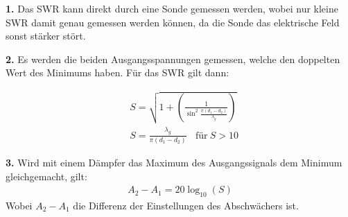\textbf{1.} Das SWR kann direkt durch eine Sonde gemessen werden, wobei nur kleine SWR
damit genau gemessen werden können, da die Sonde das elektrische Feld sonst stärker
stört.

\textbf{2.} Es werden die beiden Ausgangsspannungen gemessen, welche den doppelten Wert
des Minimums haben. Für das SWR gilt dann:

\begin{align}
  &S = \sqrt{1+  \left(\frac{1}{\sin^2{ \frac{\pi(d_1 - d_2)}{\lambda_g} }} \right) } \\
  &S = \frac{\lambda_g}{\pi(d_1-d_2)} \: \:\:\: \text{für} \:S > 10
\end{align}

\textbf{3.} Wird mit einem Dämpfer das Maximum des Ausgangssignals dem Minimum gleichgemacht, gilt:
\begin{align}
  A_2 - A_1 = 20 \log_{10}(S)
\end{align}
Wobei $A_2 - A_1$ die Differenz der Einstellungen des Abschwächers ist.
